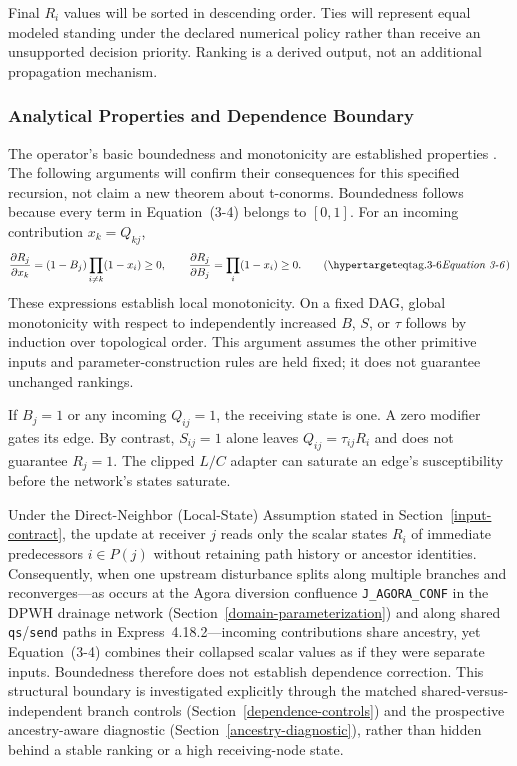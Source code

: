 Final $R_i$ values will be sorted in descending order. Ties will represent
equal modeled standing under the declared numerical policy rather than
receive an unsupported decision priority. Ranking is a derived output,
not an additional propagation mechanism.

\subsubsection{Analytical Properties and Dependence Boundary}\label{dependence-boundary}

The operator's basic boundedness and monotonicity are established
properties \citep{klement2004}. The following arguments will confirm
their consequences for this specified recursion, not claim a new theorem
about t-conorms. Boundedness follows because every term in Equation~(3-4) belongs to
$[0,1]$. For an incoming contribution $x_k=Q_{kj}$,
\[
\frac{\partial R_j}{\partial x_k}
=(1-B_j)\prod_{i\ne k}(1-x_i)\ge0,\qquad
\frac{\partial R_j}{\partial B_j}=\prod_i(1-x_i)\ge0.
\eqtag{3-6}
\]
These expressions establish local monotonicity. On a fixed DAG, global
monotonicity with respect to independently increased $B$, $S$, or $\tau$
follows by induction over topological order. This argument assumes the
other primitive inputs and parameter-construction rules are held fixed;
it does not guarantee unchanged rankings.

If $B_j=1$ or any incoming $Q_{ij}=1$, the receiving state is one.
A zero modifier gates its edge. By contrast, $S_{ij}=1$ alone leaves
$Q_{ij}=\tau_{ij}R_i$ and does not guarantee $R_j=1$.
The clipped $L/C$ adapter can saturate an edge's susceptibility before
the network's states saturate.

Under the Direct-Neighbor (Local-State) Assumption stated in
Section~\ref{input-contract}, the update at receiver $j$ reads only the
scalar states $R_i$ of immediate predecessors $i\in P(j)$ without retaining
path history or ancestor identities. Consequently, when one upstream
disturbance splits along multiple branches and reconverges---as occurs at the
Agora diversion confluence \texttt{J\_\allowbreak AGORA\_\allowbreak CONF}
in the DPWH drainage network (Section~\ref{domain-parameterization}) and along
shared \texttt{qs}/\texttt{send} paths in Express~4.18.2---incoming
contributions share ancestry, yet Equation~(3-4) combines their collapsed
scalar values as if they were separate inputs. Boundedness therefore does not
establish dependence correction. This structural boundary is investigated
explicitly through the matched shared-versus-independent branch controls
(Section~\ref{dependence-controls}) and the prospective ancestry-aware
diagnostic (Section~\ref{ancestry-diagnostic}), rather than hidden behind a
stable ranking or a high receiving-node state.

